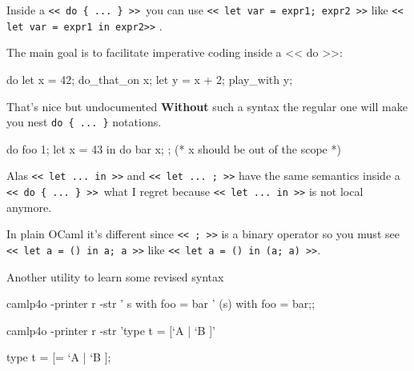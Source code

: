 Inside a \verb|<< do { ... } >> |you can use
\verb|<< let var = expr1; expr2 >>| like 
\verb|<< let var = expr1 in expr2>>| .

The main goal is to facilitate imperative coding inside a << do {} >>:
\begin{ocamlcode}
do {
 let x = 42;
 do_that_on x;
 let y = x + 2;
 play_with y;
}
\end{ocamlcode}


That's nice but undocumented \textbf{Without} such a syntax the
regular one will make you nest \verb|do { ... }| notations.
\begin{ocamlcode}
do {
 foo 1;
 let x = 43 in do {
    bar x;
 };
 (* x should be out of the scope *)
}
\end{ocamlcode}
Alas \verb|<< let ... in >>| and \verb|<< let ... ; >>| have the same
semantics inside a \verb|<< do { ... } >> |what I regret because
\verb|<< let ... in >>| is not local anymore.

In plain OCaml it's different since \verb|<< ; >>| is a binary
operator so you must see \verb|<< let a = () in a; a >>| like
\verb|<< let a = () in (a; a) >>|.


Another utility to learn some revised syntax

\begin{bluetext}
camlp4o -printer r -str '{ s with foo = bar }' 
{(s) with foo = bar;};

camlp4o -printer r -str 'type t = [`A | `B ]'

type t = [= `A | `B ];
\end{bluetext}
